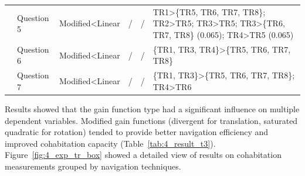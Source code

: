 \begin{table}[!t]
\begin{tabular}{p{1.6cm} | p{1.8cm} p{2.2cm} p{2cm} p{2.2cm} p{5.8cm}}
  \cline{2-6}
   & Question 5 & Modified\textless Linear & / & / & TR1\textgreater \{TR5, TR6, TR7, TR8\}; TR2\textgreater TR5; TR3\textgreater TR5; TR3\textgreater \{TR6, TR7, TR8\} (0.065); TR4\textgreater TR5 (0.065) \\ \cline{2-6}
   & Question 6 & Modified\textless Linear & / & / & \{TR1, TR3, TR4\}\textgreater \{TR5, TR6, TR7, TR8\} \\ \cline{2-6}
   & Question 7 & Modified\textless Linear & / & / & \{TR1, TR3\}\textgreater \{TR5, TR6, TR7, TR8\}; TR4\textgreater TR6 \\
  \hline
\end{tabular}
\end{table}

Results showed that the gain function type had a significant influence on multiple dependent variables. Modified gain functions (divergent for translation, saturated quadratic for rotation) tended to provide better navigation efficiency and improved cohabitation capacity (Table~\ref{tab:4_result_t3}). Figure~\ref{fig:4_exp_tr_box} showed a detailed view of results on cohabitation measurements grouped by navigation techniques.

